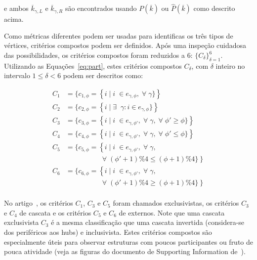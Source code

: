 \documentclass[a4paper,openright,12pt]{report} %
\begin{document}
\noindent e ambos $\overline{k}_{\gamma,L}$ e $\overline{k}_{\gamma,R}$ são encontrados  usando
$P(\overline{k})$ ou $\hat{P}(\overline{k})$
como descrito acima.

Como métricas diferentes podem ser usadas para identificas
os três tipos de vértices, critérios compostos podem ser
definidos. Após uma inspeção cuidadosa das possibilidades,
os critérios compostos foram reduzidos a 6: $\{C_\delta\}_{\delta=1}^{6}$.
Utilizando as Equações~\ref{eq:part}, estes critérios compostos $C_\delta$, com $\delta$ inteiro no intervalo $1\leq\delta<6$ podem ser descritos como:

\begin{equation}
	\begin{split}
		C_1&=\{c_{1,\phi}=\left\{i\mid i\;\in e_{\gamma,\phi}, \;\forall\; \gamma\}\right\} \\
		C_2&=\{c_{2,\phi}=\left\{i\mid \exists \;\;\gamma: i \in e_{\gamma,\phi}\}\right\} \\
		C_3&=\{c_{3,\phi}=\left\{i\mid i\;\in e_{\gamma,\phi'}, \;\forall\; \gamma,\;\forall\;\phi'\geq \phi\}\right\} \\
		C_4&=\{c_{4,\phi}=\left\{i\mid i\;\in e_{\gamma,\phi'}, \;\forall\; \gamma,\;\forall\;\phi'\leq \phi\}\right\} \\
		C_5&=\{c_{5,\phi}=\left\{i\mid i\;\in e_{\gamma,\phi'}, \;\forall\; \gamma,\right.\\
																																	&\;\;\;\;\;\;\;\;\;\;\;\;\;\;\;\;\;\; \left.\;\forall\;(\phi'+1)\%4\leq (\phi+1)\%4\}\right\} \\
		C_6&=\{c_{6,\phi}=\left\{i\mid i\;\in e_{\gamma,\phi'}, \;\forall\; \gamma,\right.\\
																																	&\;\;\;\;\;\;\;\;\;\;\;\;\;\;\;\;\;\; \left.\;\forall\;(\phi'+1)\%4\geq (\phi+1)\%4\}\right\} \\
	\end{split}
\end{equation}


No artigo~\cite{timeS}, os critérios $C_1$, $C_3$ e $C_5$ foram chamados exclusivistas, os critérios $C_3$ e $C_4$ de cascata e os critérios $C_5$ e $C_6$ de externos. Note que uma cascata exclusivista $C_3$ é a mesma classificação que uma cascata invertida (considera-se dos periféricos aos hubs) e inclusivista. Estes critérios compostos são especialmente úteis para observar estruturas com poucos participantes ou fruto de pouca atividade (veja as figuras do documento de Supporting Information de~\cite{timeS}).
\end{document}

